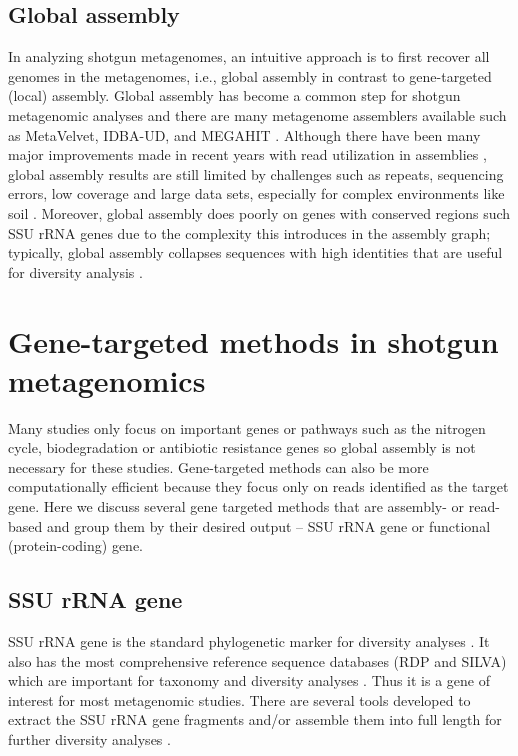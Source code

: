 \documentclass[]{msu-thesis}
\begin{document}
\subsection{Global assembly} 
In analyzing shotgun metagenomes, an
intuitive approach is to first recover all genomes in the metagenomes,
i.e., global assembly in contrast to gene-targeted
(local) assembly. Global assembly has become a common step for shotgun
metagenomic analyses and there are many metagenome assemblers
available such as MetaVelvet, IDBA-UD, and MEGAHIT
\cite{li_megahit:_2015,namiki_metavelvet:_2012,peng_idba-ud:_2012}.
Although there have been many major improvements made in recent years with read utilization in assemblies
\cite{li_megahit:_2015}, global assembly results are still limited by
challenges such as repeats, sequencing errors, low coverage and
large data sets, especially for complex environments like soil
\cite{howe_tackling_2014}. Moreover, global assembly does poorly on
genes with conserved regions such SSU rRNA genes due to the complexity
this introduces in the assembly graph; typically, global assembly
collapses sequences with high identities
that are useful for diversity analysis
\cite{guo_microbial_2015,miller_emirge:_2011}.

\section{Gene-targeted methods in shotgun metagenomics}

Many studies only focus on important genes or pathways such as the
nitrogen cycle, biodegradation or antibiotic resistance genes so global
assembly is not necessary for these studies.  Gene-targeted methods can
also be more computationally efficient because they focus only on reads
identified as the target gene. Here we discuss several gene targeted
methods that are assembly- or read-based and group them by their desired
output -- SSU rRNA gene or functional (protein-coding) gene.

\subsection{SSU rRNA gene} 
SSU rRNA gene is the standard
phylogenetic marker for diversity analyses
\cite{lane_rapid_1985,huse_exploring_2008}. It also has the most comprehensive
reference sequence databases (RDP and SILVA) which are important
for taxonomy and diversity analyses
\cite{cole_ribosomal_2014,quast_silva_2013}. Thus it is a gene of
interest for most metagenomic studies. There are several tools developed
to extract the SSU rRNA gene fragments and/or assemble them into full
length for further diversity analyses
\cite{miller_emirge:_2011,yuan_reconstructing_2015,guo_microbial_2015}.
\end{document}
